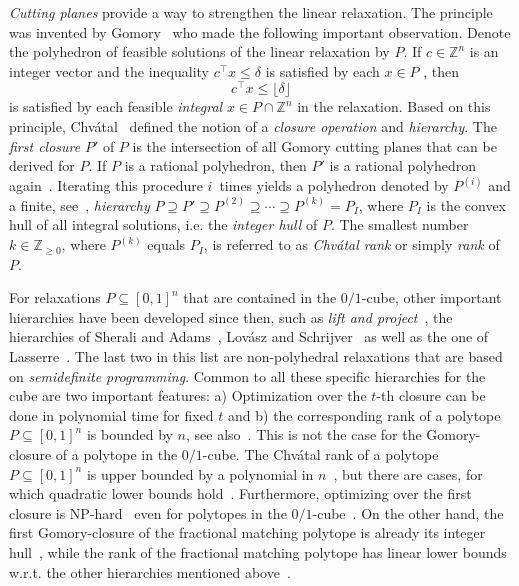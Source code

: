 \documentclass[11pt]{article}
\newcommand{\fritztodo}[1]{\todo[backgroundcolor=cyantransparent, linecolor=cyan!80]{#1}}
\newcommand{\NP}{{\sf NP}}
\newcommand{\Z}{\mathbb{Z}}
\theoremstyle{remark}
\begin{document}
  \emph{Cutting planes} provide a way to strengthen the linear relaxation.  The principle was invented by Gomory~\cite{Gomory58} who made the following important observation.  %
Denote the polyhedron of feasible solutions of the linear relaxation by $P$.  If $c ∈ℤ^n$ is an integer vector and the inequality $c^\intercal x ≤ δ$ is satisfied by each $x ∈ P$ , then
\begin{equation}
  \label{eq:3}
  c^\intercal x ≤ ⌊δ ⌋
\end{equation}
is satisfied by each feasible \emph{integral}  $x ∈ P ∩ℤ^n$ in the relaxation. Based on this principle, Chvátal~\cite{Chvatal73} defined the notion of a \emph{closure operation} and  \emph{hierarchy}. %
The \emph{first closure} $P'$  of $P$ is the intersection of all Gomory cutting planes that can be derived for $P$. If $P$ is a rational polyhedron, then $P'$  is a rational polyhedron again~\cite{MR597387}. Iterating this procedure $i$~times  yields a polyhedron denoted by $P^{(i)}$ and a finite, see~\cite{MR597387}, \emph{hierarchy}  $P ⊇ P' ⊇ P^{(2)} ⊇ \cdots ⊇ P^{(k)}=P_I$, where $P_I$ is the convex hull of all integral solutions, i.e. the \emph{integer hull} of $P$. The smallest number $k∈ \Z_{\geq 0}$, where $P^{(k)}$ equals $P_I$, is referred to as \emph{Chvátal rank} or simply \emph{rank} of $P$.

For relaxations $P ⊆[0,1]^n$ that are contained in the $0/1$-cube, other important hierarchies have been  developed since then, such as \emph{lift and project}~\cite{BCC96}, the hierarchies of Sherali and Adams~\cite{SheraliAdams90}, Lov{\'a}sz and Schrijver~\cite{LovaszSchrijver90} as well as the one of Lasserre~\cite{MR2041934}. The last two in this list are non-polyhedral relaxations that are based on \emph{semidefinite programming}. Common to all these specific hierarchies for the cube are two important features: a) Optimization over the $t$-th closure can be done in polynomial time for fixed $t$ and b) the corresponding rank of a polytope $P ⊆ [0,1]^n$ is bounded by $n$, see also~\cite{MR1997246}. 
This is not the case for the Gomory-closure of a polytope in the $0/1$-cube. The Chvátal rank of a polytope $P ⊆[0,1]^n$ is upper bounded by a polynomial in $n$~\cite{BEHS99,es03}, but there are cases, for which quadratic lower bounds hold~\cite{rothvoss20170}. Furthermore, optimizing over the first closure is \NP-hard~\cite{eisen99} even for polytopes in the $0/1$-cube~\cite{cornuejols2020rational,cornuejols2018gomory}.  On the other hand, the first Gomory-closure of the fractional matching polytope is already its integer hull~\cite{Edmonds65b}, while the rank of the fractional matching polytope has linear lower bounds w.r.t. the other hierarchies mentioned above~\cite{mathieu2009sherali,au2016comprehensive}. 
\end{document}
